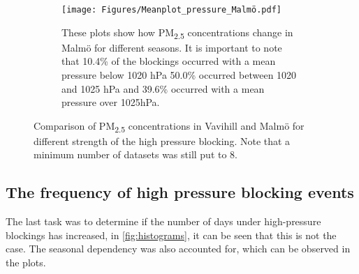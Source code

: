 \begin{figure}[H]
    \hfill
    \begin{subfigure}[b]{0.49\textwidth}
        \centering
        \texttt{[image: Figures/Meanplot\_pressure\_Malmö.pdf]}
        \caption{These plots show how PM\textsubscript{2.5} concentrations change in Malmö for different seasons. It is important to note that 10.4\% of the blockings occurred with a mean pressure below 1020 hPa 50.0\% occurred between 1020 and 1025 hPa and 39.6\% occurred with a mean pressure over 1025hPa.}
        \label{fig:Meanplot_pressure_Malmö}
    \end{subfigure}
    \caption{Comparison of PM\textsubscript{2.5} concentrations in Vavihill and Malmö for different strength of the high pressure blocking. Note that a minimum number of datasets was still put to 8. }
    \label{fig:PM25_blocking_strength}
\end{figure}

\subsection{The frequency of high pressure blocking events}
The last task was to determine if the number of days under high-pressure blockings has increased, in \autoref{fig:histograms}, it can be seen that this is not the case. The seasonal dependency was also accounted for, which can be observed in the plots.


